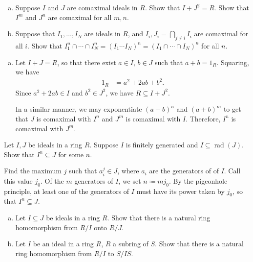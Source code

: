 \documentclass[10pt]{mypackage}
\begin{document}
\begin{exercise}[Exercise 2.40]\hfill
  \begin{enumerate}[(a)]
    \item Suppose $I$ and $J$ are comaximal ideals in $R$. Show that $I + J^2 = R$. Show that $I^m$ and $J^n$ are comaximal for all $m,n$.
    \item Suppose that $I_1,\dots,I_N$ are ideals in $R$, and $I_i,J_i = \bigcap_{j\neq i}I_i$ are comaximal for all $i$. Show that $I_1^{n}\cap\cdots\cap I_N^{n} = \left( I_1\cdots I_N \right)^{n} = \left( I_1\cap\cdots\cap I_N \right)^{n}$ for all $n$.
  \end{enumerate}
\end{exercise}
\begin{solution}\hfill
  \begin{enumerate}[(a)]
    \item Let $I + J = R$, so that there exist $a\in I$, $b\in J$ such that $a + b = 1_R$. Squaring, we have
      \begin{align*}
        1_{R} &= a^2 + 2ab + b^2.
      \end{align*}
      Since $a^2 + 2ab\in I$ and $b^2\in J^2$, we have $R\subseteq I + J^2$.\newline

      In a similar manner, we may exponentiate $\left( a + b \right)^{n}$ and $\left( a + b \right)^{m}$ to get that $J$ is comaximal with $I^{n}$ and $J^{m}$ is comaximal with $I$. Therefore, $I^{n}$ is comaximal with $J^{m}$.
  \end{enumerate}
\end{solution}
\begin{exercise}[Exercise 2.41]
  Let $I,J$ be ideals in a ring $R$. Suppose $I$ is finitely generated and $I\subseteq \operatorname{rad}\left( J \right)$. Show that $I^{n}\subseteq J$ for some $n$.
\end{exercise}
\begin{solution}
  Find the maximum $j$ such that $a_i^{j}\in J$, where $a_i$ are the generators of of $I$. Call this value $j_0$. Of the $m$ generators of $I$, we set $n\coloneq mj_0$. By the pigeonhole principle, at least one of the generators of $I$ must have its power taken by $j_0$, so that $I^{n}\subseteq J$.
\end{solution}
\begin{exercise}\hfill
  \begin{enumerate}[(a)]
    \item Let $I\subseteq J$ be ideals in a ring $R$. Show that there is a natural ring homomorphism from $R/I$ onto $R/J$.
    \item Let $I$ be an ideal in a ring $R$, $R$ a subring of $S$. Show that there is a natural ring homomorphism from $R/I$ to $S/IS$.
  \end{enumerate}
\end{exercise}
\end{document}
